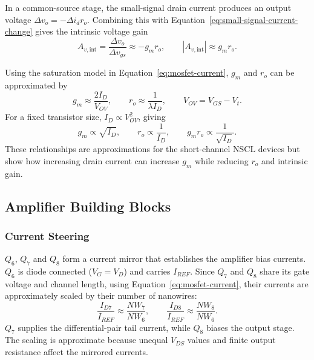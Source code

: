 \documentclass[11pt,a4paper]{article}
\begin{document}
In a common-source stage, the small-signal drain current produces an output voltage $\Delta v_o=-\Delta i_d r_o$. Combining this with Equation~\eqref{eq:small-signal-current-change} gives the intrinsic voltage gain
\begin{equation}
    A_{v,\mathrm{int}}=\frac{\Delta v_o}{\Delta v_{gs}}
    \approx-g_mr_o, \qquad
    |A_{v,\mathrm{int}}|\approx g_mr_o.
    \label{eq:intrinsic-voltage-gain}
\end{equation}

Using the saturation model in Equation~\eqref{eq:mosfet-current}, $g_m$ and $r_o$ can be approximated by
\begin{equation}
    g_m\approx\frac{2I_D}{V_{OV}}, \qquad
    r_o\approx\frac{1}{\lambda I_D},
    \qquad V_{OV}=V_{GS}-V_t.
    \label{eq:gm-ro-current}
\end{equation}
For a fixed transistor size, $I_D\propto V_{OV}^2$, giving
\begin{equation}
    g_m\propto\sqrt{I_D}, \qquad
    r_o\propto\frac{1}{I_D}, \qquad
    g_mr_o\propto\frac{1}{\sqrt{I_D}}.
    \label{eq:intrinsic-gain-current}
\end{equation}
These relationships are approximations for the short-channel NSCL devices but show how increasing drain current can increase $g_m$ while reducing $r_o$ and intrinsic gain.

\subsection{Amplifier Building Blocks}

\subsubsection{Current Steering}

$Q_6$, $Q_7$ and $Q_8$ form a current mirror that establishes the amplifier bias currents. $Q_6$ is diode connected ($V_G = V_D$) and carries $I_{REF}$. Since $Q_7$ and $Q_8$ share its gate voltage and channel length, using Equation~\ref{eq:mosfet-current}, their currents are approximately scaled by their number of nanowires:
\begin{equation}
    \frac{I_{D7}}{I_{REF}}\approx\frac{NW_7}{NW_6}, \qquad
    \frac{I_{D8}}{I_{REF}}\approx\frac{NW_8}{NW_6}.
    \label{eq:current-mirror-scaling}
\end{equation}
$Q_7$ supplies the differential-pair tail current, while $Q_8$ biases the output stage. The scaling is approximate because unequal $V_{DS}$ values and finite output resistance affect the mirrored currents.
\end{document}
